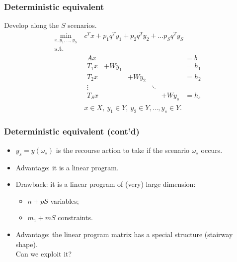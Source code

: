 \documentclass{beamer}
\begin{document}
\begin{frame}
	\frametitle{Deterministic equivalent}
	
	Develop along the $S$ scenarios.
	\begin{align*}
	\min_{x, y_1, \ldots, y_S}\ & c^T x + p_1 q^T y_1 + p_2 q^T y_2 + \ldots
	p_S q^Ty_S \\
	\mbox{s.t. } & \\
	& \begin{matrix} Ax & & & & & = b\\
	T_1 x & + W y_1 & & & & = h_1 \\
	T_2 x & & + W y_2 & & & = h_2 \\
	\vdots & & & \ddots & \\
	T_S x & & & & + W y_s & = h_s
	\end{matrix} \\
	& x \in X,\ y_1 \in Y,\ y_2 \in Y,\ldots, y_s \in Y.
	\end{align*}
	
\end{frame}

\begin{frame}
	\frametitle{Deterministic equivalent (cont'd)}
	
	\begin{itemize}
		\item
		$y_s = y(\omega_s)$ is the recourse action to take if the scenario
		$\omega_s$ occurs.
		\item
		Advantage: it is a linear program.
		\item
		Drawback: it is a linear program of (very) large dimension:
		\begin{itemize}
			\item
			$n+pS$ variables;
			\item
			$m_1+mS$ constraints.
		\end{itemize}
		\item
		Advantage: the linear program matrix has a special structure (stairway shape).\\
		Can we exploit it?
	\end{itemize}
	
\end{frame}
\end{document}
